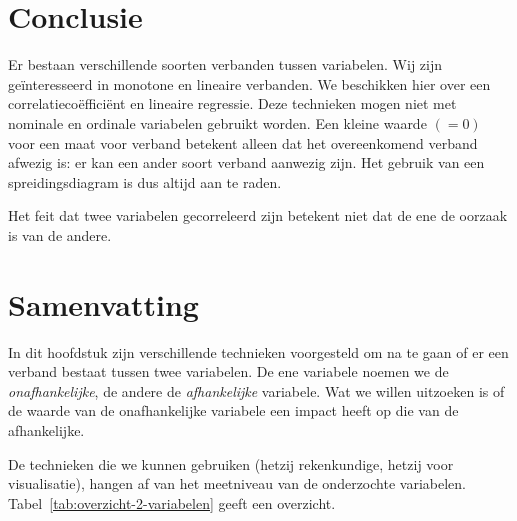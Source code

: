 \section{Conclusie}

Er bestaan verschillende soorten verbanden tussen variabelen. Wij zijn geïnteresseerd in monotone en lineaire verbanden. We beschikken hier over een correlatieco\"effici\"ent en lineaire regressie. Deze technieken mogen niet met nominale en ordinale variabelen gebruikt worden. Een kleine waarde $(=0)$ voor een maat voor verband betekent alleen dat het overeenkomend verband afwezig is: er kan een ander soort verband aanwezig zijn. Het gebruik van een spreidingsdiagram is dus altijd aan te raden.

Het feit dat twee variabelen gecorreleerd zijn betekent niet dat de ene de oorzaak is van de andere.

\section{Samenvatting}

In dit hoofdstuk zijn verschillende technieken voorgesteld om na te gaan of er een verband bestaat tussen twee variabelen. De ene variabele noemen we de \emph{onafhankelijke}, de andere de \emph{afhankelijke} variabele. Wat we willen uitzoeken is of de waarde van de onafhankelijke variabele een impact heeft op die van de afhankelijke.

De technieken die we kunnen gebruiken (hetzij rekenkundige, hetzij voor visualisatie), hangen af van het meetniveau van de onderzochte variabelen. Tabel~\ref{tab:overzicht-2-variabelen} geeft een overzicht.

